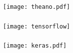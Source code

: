 





\begin{frame}[fragile] \frametitle{}

\texttt{[image: theano.pdf]}

\end{frame}

\begin{frame}[fragile] \frametitle{}

\texttt{[image: tensorflow]}

\end{frame}







\begin{frame}[fragile] \frametitle{}

\texttt{[image: keras.pdf]}

\end{frame}


